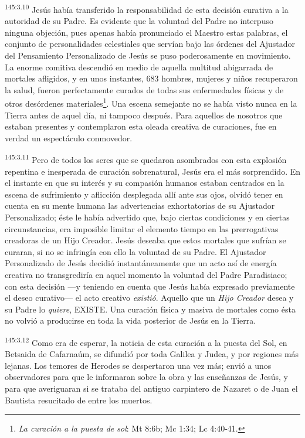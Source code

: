 \par
\textsuperscript{145:3.10} Jesús había transferido la responsabilidad de esta decisión curativa a la autoridad de su Padre. Es evidente que la voluntad del Padre no interpuso ninguna objeción, pues apenas había pronunciado el Maestro estas palabras, el conjunto de personalidades celestiales que servían bajo las órdenes del Ajustador del Pensamiento Personalizado de Jesús se puso poderosamente en movimiento. La enorme comitiva descendió en medio de aquella multitud abigarrada de mortales afligidos, y en unos instantes, 683 hombres, mujeres y niños recuperaron la salud, fueron perfectamente curados de todas sus enfermedades físicas y de otros desórdenes materiales\footnote{\textit{La curación a la puesta de sol}: Mt 8:6b; Mc 1:34; Lc 4:40-41.}. Una escena semejante no se había visto nunca en la Tierra antes de aquel día, ni tampoco después. Para aquellos de nosotros que estaban presentes y contemplaron esta oleada creativa de curaciones, fue en verdad un espectáculo conmovedor.

\par
\textsuperscript{145:3.11} Pero de todos los seres que se quedaron asombrados con esta explosión repentina e inesperada de curación sobrenatural, Jesús era el más sorprendido. En el instante en que su interés y su compasión humanos estaban centrados en la escena de sufrimiento y aflicción desplegada allí ante sus ojos, olvidó tener en cuenta en su mente humana las advertencias exhortatorias de su Ajustador Personalizado; éste le había advertido que, bajo ciertas condiciones y en ciertas circunstancias, era imposible limitar el elemento tiempo en las prerrogativas creadoras de un Hijo Creador. Jesús deseaba que estos mortales que sufrían se curaran, si no se infringía con ello la voluntad de su Padre. El Ajustador Personalizado de Jesús decidió instantáneamente que un acto así de energía creativa no transgrediría en aquel momento la voluntad del Padre Paradisiaco; con esta decisión ---y teniendo en cuenta que Jesús había expresado previamente el deseo curativo--- el acto creativo \textit{existió}. Aquello que un \textit{Hijo Creador} desea y su Padre lo \textit{quiere}, EXISTE. Una curación física y masiva de mortales como ésta no volvió a producirse en toda la vida posterior de Jesús en la Tierra.

\par
\textsuperscript{145:3.12} Como era de esperar, la noticia de esta curación a la puesta del Sol, en Betsaida de Cafarnaúm, se difundió por toda Galilea y Judea, y por regiones más lejanas. Los temores de Herodes se despertaron una vez más; envió a unos observadores para que le informaran sobre la obra y las enseñanzas de Jesús, y para que averiguaran si se trataba del antiguo carpintero de Nazaret o de Juan el Bautista resucitado de entre los muertos.

